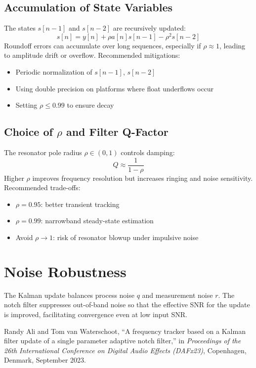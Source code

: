 \documentclass{article}
\begin{document}
\subsection{Accumulation of State Variables}

The states \( s[n-1] \) and \( s[n-2] \) are recursively updated:
\[
s[n] = y[n] + \rho a[n] s[n-1] - \rho^2 s[n-2]
\]
Roundoff errors can accumulate over long sequences, especially if \( \rho \approx 1 \), leading to amplitude drift or overflow. Recommended mitigations:
\begin{itemize}
\item Periodic normalization of \( s[n-1] \), \( s[n-2] \)
\item Using double precision on platforms where float underflows occur
\item Setting \(\rho \leq 0.99\) to ensure decay
\end{itemize}

\subsection{Choice of \texorpdfstring{$\rho$}{rho} and Filter Q-Factor}

The resonator pole radius \( \rho \in (0, 1) \) controls damping:
\[
Q \approx \frac{1}{1 - \rho}
\]
Higher \( \rho \) improves frequency resolution but increases ringing and noise sensitivity. Recommended trade-offs:
\begin{itemize}
\item \(\rho = 0.95\): better transient tracking
\item \(\rho = 0.99\): narrowband steady-state estimation
\item Avoid \(\rho \to 1\): risk of resonator blowup under impulsive noise
\end{itemize}

\section{Noise Robustness}

The Kalman update balances process noise \(q\) and measurement noise \(r\).  The notch filter suppresses out-of-band noise so that the effective SNR for the update is improved, facilitating convergence even at low input SNR.

\begin{thebibliography}{9}
Randy Ali and Tom van Waterschoot,  
``A frequency tracker based on a Kalman filter update of a single parameter adaptive notch filter,''  
in \emph{Proceedings of the 26th International Conference on Digital Audio Effects (DAFx23)},  
Copenhagen, Denmark, September 2023.
\end{thebibliography}
\end{document}
